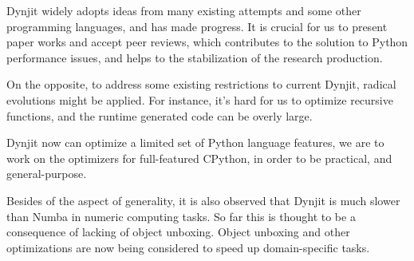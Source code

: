 \documentclass[conference]{IEEEtran}
\begin{document}
Dynjit widely adopts ideas from many existing attempts and some other programming languages, and has made progress.
It is crucial for us to present paper works and accept peer reviews, which contributes to the solution to Python performance issues,
and helps to the stabilization of the research production.

On the opposite, to address some existing restrictions to current Dynjit, radical evolutions might be applied.
For instance, it's hard for us to optimize recursive functions, and the runtime generated code can be overly large.

Dynjit now can optimize a limited set of Python language features, we are to work on the optimizers
for full-featured CPython, in order to be practical, and general-purpose.

Besides of the aspect of generality, it is also observed that Dynjit is much slower than Numba in numeric computing tasks.
So far this is thought to be a consequence of lacking of object unboxing. Object unboxing and
other optimizations are now being considered to speed up domain-specific tasks.

\medskip


\end{document}
